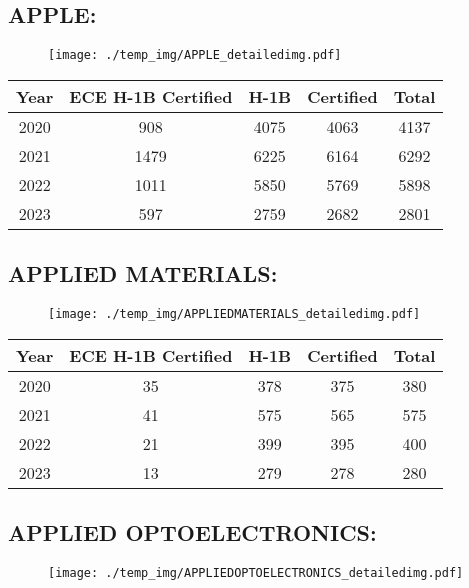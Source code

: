 \documentclass{article}%
\begin{document}
%
\newpage%
\subsection{APPLE:}%
\label{subsec:APPLE}%
\label{APPLEdetailed}%


\begin{figure}[htbp]%
\centering%
\texttt{[image: ./temp\_img/APPLE\_detailedimg.pdf]}%
\end{figure}

%
\begin{longtable}{c|c|c|c|c}%
\hline%
Year&ECE H{-}1B Certified&H{-}1B&Certified&Total\\%
\hline%
2020&908&4075&4063&4137\\%
\hline%
2021&1479&6225&6164&6292\\%
\hline%
2022&1011&5850&5769&5898\\%
\hline%
2023&597&2759&2682&2801\\%
\hline%
\end{longtable}

%
\newpage%
\subsection{APPLIED MATERIALS:}%
\label{subsec:APPLIEDMATERIALS}%
\label{APPLIEDMATERIALSdetailed}%


\begin{figure}[htbp]%
\centering%
\texttt{[image: ./temp\_img/APPLIEDMATERIALS\_detailedimg.pdf]}%
\end{figure}

%
\begin{longtable}{c|c|c|c|c}%
\hline%
Year&ECE H{-}1B Certified&H{-}1B&Certified&Total\\%
\hline%
2020&35&378&375&380\\%
\hline%
2021&41&575&565&575\\%
\hline%
2022&21&399&395&400\\%
\hline%
2023&13&279&278&280\\%
\hline%
\end{longtable}

%
\newpage%
\subsection{APPLIED OPTOELECTRONICS:}%
\label{subsec:APPLIEDOPTOELECTRONICS}%
\label{APPLIEDOPTOELECTRONICSdetailed}%


\begin{figure}[htbp]%
\centering%
\texttt{[image: ./temp\_img/APPLIEDOPTOELECTRONICS\_detailedimg.pdf]}%
\end{figure}
\end{document}
